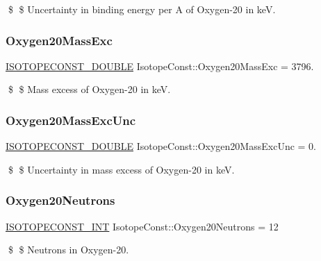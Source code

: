 \$ \$ Uncertainty in binding energy per A of Oxygen-\/20 in keV. \mbox{\label{group___isotope_const-_oxygen-_o20_ga26c207da0755d1687dae8f40bb288ec1}} 
\subsubsection{\texorpdfstring{Oxygen20\+Mass\+Exc}{Oxygen20MassExc}}
{\footnotesize\ttfamily \mbox{\hyperlink{group___isotope_const-_macros_ga8f45a7272ce02c0b4c65c44636ed719a}{I\+S\+O\+T\+O\+P\+E\+C\+O\+N\+S\+T\+\_\+\+D\+O\+U\+B\+LE}} Isotope\+Const\+::\+Oxygen20\+Mass\+Exc = 3796.}

\$ \$ Mass excess of Oxygen-\/20 in keV. \mbox{\label{group___isotope_const-_oxygen-_o20_ga93560e29230b0607b3c64fd7f27cd8a7}} 
\subsubsection{\texorpdfstring{Oxygen20\+Mass\+Exc\+Unc}{Oxygen20MassExcUnc}}
{\footnotesize\ttfamily \mbox{\hyperlink{group___isotope_const-_macros_ga8f45a7272ce02c0b4c65c44636ed719a}{I\+S\+O\+T\+O\+P\+E\+C\+O\+N\+S\+T\+\_\+\+D\+O\+U\+B\+LE}} Isotope\+Const\+::\+Oxygen20\+Mass\+Exc\+Unc = 0.}

\$ \$ Uncertainty in mass excess of Oxygen-\/20 in keV. \mbox{\label{group___isotope_const-_oxygen-_o20_ga466934bad55ca6ec510639df6ebd5523}} 
\subsubsection{\texorpdfstring{Oxygen20\+Neutrons}{Oxygen20Neutrons}}
{\footnotesize\ttfamily \mbox{\hyperlink{group___isotope_const-_macros_ga5f18360b3e99483a35c32d789e62621c}{I\+S\+O\+T\+O\+P\+E\+C\+O\+N\+S\+T\+\_\+\+I\+NT}} Isotope\+Const\+::\+Oxygen20\+Neutrons = 12}

\$ \$ Neutrons in Oxygen-\/20. \mbox{\label{group___isotope_const-_oxygen-_o20_ga041a8f44134d187dcac56d2ca4d73d67}} 
